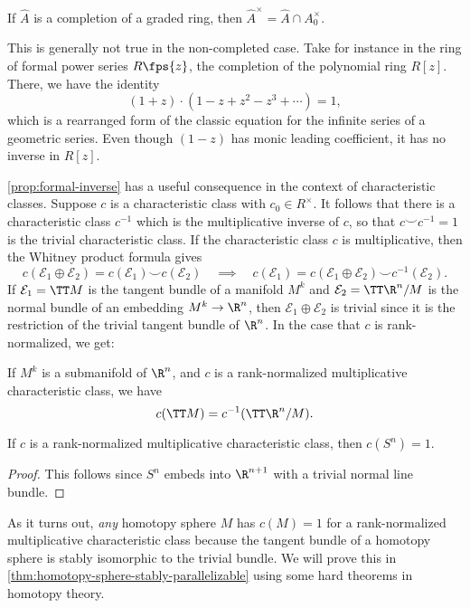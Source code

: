 \begin{proposition}\label{prop:formal-inverse}
	If $\widehat{A}$ is a completion of a graded ring, then $\widehat{A}^\times = \widehat{A} \cap A_0^\times$.
\end{proposition}

\begin{remark}
	This is generally not true in the non-completed case. Take for instance in the ring of formal power series $R\fps{z}$, the completion of the polynomial ring $R[z]$. There, we have the identity
	\[
		(1+z)\cdot (1-z+z^2-z^3+\cdots) = 1,
	\]
	which is a rearranged form of the classic equation for the infinite series of a geometric series. Even though $(1-z)$ has monic leading coefficient, it has no inverse in $R[z]$.
\end{remark}

\cref{prop:formal-inverse} has a useful consequence in the context of characteristic classes. Suppose $c$ is a characteristic class with $c_0\in R^\times$. It follows that there is a characteristic class $c^{-1}$ which is the multiplicative inverse of $c$, so that $c\smile c^{-1}=1$ is the trivial characteristic class. If the characteristic class $c$ is multiplicative, then the Whitney product formula gives
\[
	c(\mathcal{E}_1\oplus\mathcal{E}_2)	 = c(\mathcal{E}_1)\smile c(\mathcal{E}_2)
	\quad\implies\quad
	c(\mathcal{E}_1) = c(\mathcal{E}_1\oplus \mathcal{E}_2) \smile c^{-1}(\mathcal{E}_2).
\]
If $\mathcal{E}_1=\TT M$ is the tangent bundle of a manifold $M^k$ and $\mathcal{E}_2=\TT\R^{n}/M$ is the normal bundle of an embedding $M^k\to \R^{n}$, then $\mathcal{E}_1\oplus \mathcal{E}_2$ is trivial since it is the restriction of the trivial tangent bundle of $\R^n$. In the case that $c$ is rank-normalized, we get:
\begin{theorem}\label{thm:whitney-duality}
	If $M^k$ is a submanifold of $\R^n$, and $c$ is a rank-normalized multiplicative characteristic class, we have
	\[
		c(\TT M) = c^{-1}(\TT \R^n/M).
	\]
\end{theorem}

\begin{corollary}
	If $c$ is a rank-normalized multiplicative characteristic class, then $c(S^n)=1$.
\end{corollary}
\begin{proof}
	This follows since $S^n$ embeds into $\R^{n+1}$ with a trivial normal line bundle.
\end{proof}

\begin{remark}
	As it turns out, \emph{any} homotopy sphere $M$ has $c(M)=1$ for a rank-normalized multiplicative characteristic class because the tangent bundle of a homotopy sphere is stably isomorphic to the trivial bundle. We will prove this in \cref{thm:homotopy-sphere-stably-parallelizable} using some hard theorems in homotopy theory.
\end{remark}

